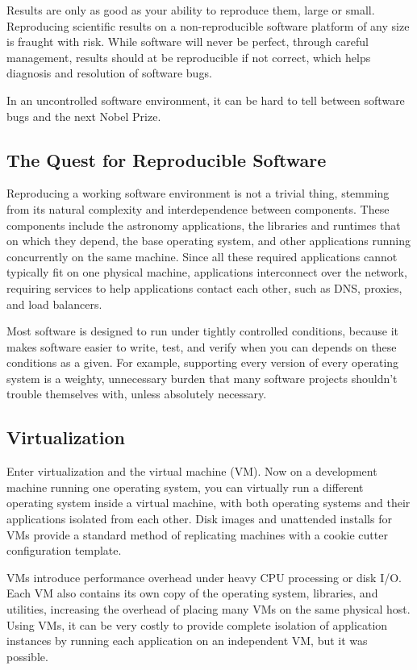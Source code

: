 \documentclass[11pt,twoside]{article}
\begin{document}
Results are only as good as your ability to reproduce them, large or small.
Reproducing scientific results on a non-reproducible software platform of any size
is fraught with risk.  While software will never be perfect, through careful
management, results should at be reproducible if not correct, which helps diagnosis
and resolution of software bugs.

In an uncontrolled software environment, it can be hard to tell between software bugs
and the next Nobel Prize.

\subsection{The Quest for Reproducible Software}

Reproducing a working software environment is not a trivial thing, stemming from
its natural complexity and interdependence between components.  These components
include the astronomy applications, the libraries and runtimes that
on which they depend, the base operating system, and other applications running 
concurrently on the same machine.  Since all these required applications cannot
typically fit on one physical machine, applications interconnect over the network,
requiring services to help applications contact each other, such as DNS, proxies,
and load balancers.

Most software is designed to run under tightly controlled conditions, because
it makes software easier to write, test, and verify when you can depends on these
conditions as a given.  For example, supporting every version of every
operating system is a weighty, unnecessary burden that many software projects
shouldn't trouble themselves with, unless absolutely necessary.

\subsection{Virtualization}

Enter virtualization and the virtual machine (VM).  Now on a development machine running
one operating system, you can virtually run a different operating system inside a virtual
machine, with both operating systems and their applications isolated from each other.
Disk images and unattended installs for VMs provide a standard method of replicating
machines with a cookie cutter configuration template.

VMs introduce performance overhead under heavy CPU processing or disk I/O.
Each VM also contains its own copy of the operating
system, libraries, and utilities, increasing the overhead of placing many VMs on the same
physical host.
Using VMs, it can be very costly to provide complete isolation of application
instances by running each application on an independent VM, but it was possible.
\end{document}
